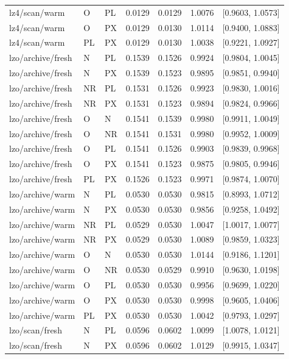 \begin{longtable}{lllrrrr}
lz4/scan/warm & O & PL & 0.0129 & 0.0129 & 1.0076 & [0.9603, 1.0573] \\
lz4/scan/warm & O & PX & 0.0129 & 0.0130 & 1.0114 & [0.9400, 1.0883] \\
lz4/scan/warm & PL & PX & 0.0129 & 0.0130 & 1.0038 & [0.9221, 1.0927] \\
lzo/archive/fresh & N & PL & 0.1539 & 0.1526 & 0.9924 & [0.9804, 1.0045] \\
lzo/archive/fresh & N & PX & 0.1539 & 0.1523 & 0.9895 & [0.9851, 0.9940] \\
lzo/archive/fresh & NR & PL & 0.1531 & 0.1526 & 0.9923 & [0.9830, 1.0016] \\
lzo/archive/fresh & NR & PX & 0.1531 & 0.1523 & 0.9894 & [0.9824, 0.9966] \\
lzo/archive/fresh & O & N & 0.1541 & 0.1539 & 0.9980 & [0.9911, 1.0049] \\
lzo/archive/fresh & O & NR & 0.1541 & 0.1531 & 0.9980 & [0.9952, 1.0009] \\
lzo/archive/fresh & O & PL & 0.1541 & 0.1526 & 0.9903 & [0.9839, 0.9968] \\
lzo/archive/fresh & O & PX & 0.1541 & 0.1523 & 0.9875 & [0.9805, 0.9946] \\
lzo/archive/fresh & PL & PX & 0.1526 & 0.1523 & 0.9971 & [0.9874, 1.0070] \\
lzo/archive/warm & N & PL & 0.0530 & 0.0530 & 0.9815 & [0.8993, 1.0712] \\
lzo/archive/warm & N & PX & 0.0530 & 0.0530 & 0.9856 & [0.9258, 1.0492] \\
lzo/archive/warm & NR & PL & 0.0529 & 0.0530 & 1.0047 & [1.0017, 1.0077] \\
lzo/archive/warm & NR & PX & 0.0529 & 0.0530 & 1.0089 & [0.9859, 1.0323] \\
lzo/archive/warm & O & N & 0.0530 & 0.0530 & 1.0144 & [0.9186, 1.1201] \\
lzo/archive/warm & O & NR & 0.0530 & 0.0529 & 0.9910 & [0.9630, 1.0198] \\
lzo/archive/warm & O & PL & 0.0530 & 0.0530 & 0.9956 & [0.9699, 1.0220] \\
lzo/archive/warm & O & PX & 0.0530 & 0.0530 & 0.9998 & [0.9605, 1.0406] \\
lzo/archive/warm & PL & PX & 0.0530 & 0.0530 & 1.0042 & [0.9793, 1.0297] \\
lzo/scan/fresh & N & PL & 0.0596 & 0.0602 & 1.0099 & [1.0078, 1.0121] \\
lzo/scan/fresh & N & PX & 0.0596 & 0.0602 & 1.0129 & [0.9915, 1.0347] \\

\end{longtable}
